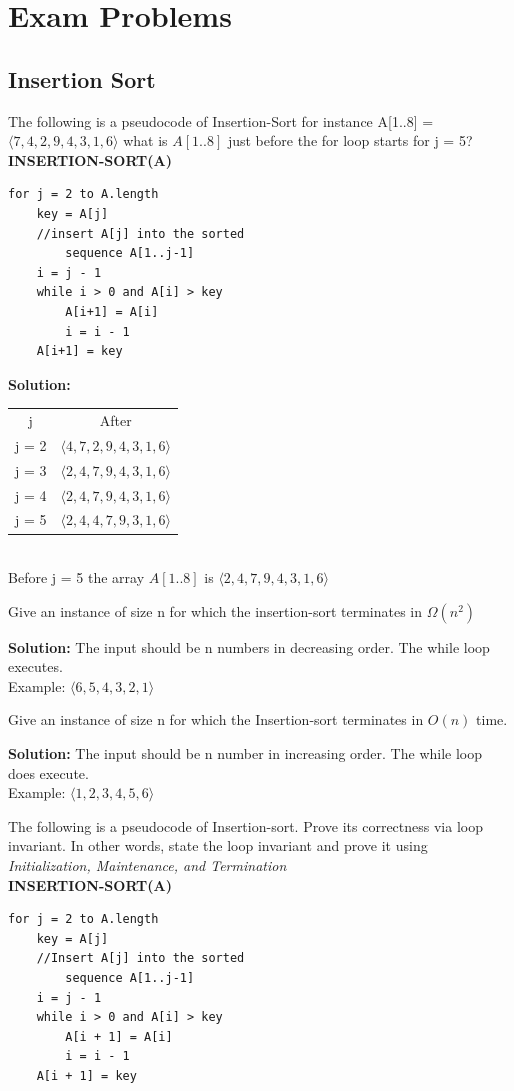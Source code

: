 \documentclass[11pt,fleqn]{book}
\begin{document}
\section{Exam Problems} 
\subsection{Insertion Sort}
\begin{example}
The following is a pseudocode of Insertion-Sort for instance A[1..8] = $\langle 7,4,2,9,4,3,1,6\rangle$ what is $A[1..8]$ just before the for loop starts for j = 5?
\vspace{1em}
\\
\textbf{INSERTION-SORT(A)}
\begin{lstlisting}
for j = 2 to A.length
    key = A[j]
    //insert A[j] into the sorted
        sequence A[1..j-1]
    i = j - 1
    while i > 0 and A[i] > key
        A[i+1] = A[i]
        i = i - 1
    A[i+1] = key
\end{lstlisting}
\end{example}
\textbf{Solution:}
\vspace{1em}
\begin{tabular}{c|c}
    j & After \\
    j = 2 & $\langle 4,7,2,9,4,3,1,6 \rangle$ \\
    j = 3 & $\langle 2,4,7,9,4,3,1,6 \rangle$ \\
    j = 4 & $\langle 2,4,7,9,4,3,1,6\rangle$ \\
    j = 5 & $\langle 2,4,4,7,9,3,1,6 \rangle$ \\
\end{tabular}
\\
Before j = 5 the array $A[1..8]$ is $\langle 2,4,7,9,4,3,1,6\rangle$
\begin{example}
Give an instance of size n for which the insertion-sort terminates in $\Omega(n^2)$
\end{example}
\textbf{Solution:} The input should be n numbers in decreasing order. The while loop executes.  \\
Example: $\langle 6,5,4,3,2,1 \rangle$
\begin{example}
Give an instance of size n for which the Insertion-sort terminates in $O(n)$ time.
\end{example}
\textbf{Solution:} The input should be n number in increasing order. The while loop does execute.\\
Example: $\langle 1,2,3,4,5,6 \rangle$
\begin{example}
The following is a pseudocode of Insertion-sort. Prove its correctness via loop invariant. In other words, state the loop invariant and prove it using \textit{Initialization, Maintenance, and Termination}\\
\textbf{INSERTION-SORT(A)}
\begin{lstlisting}
for j = 2 to A.length 
    key = A[j]
    //Insert A[j] into the sorted 
        sequence A[1..j-1]
    i = j - 1
    while i > 0 and A[i] > key
        A[i + 1] = A[i]
        i = i - 1
    A[i + 1] = key 
\end{lstlisting}
\end{example}
\end{document}

